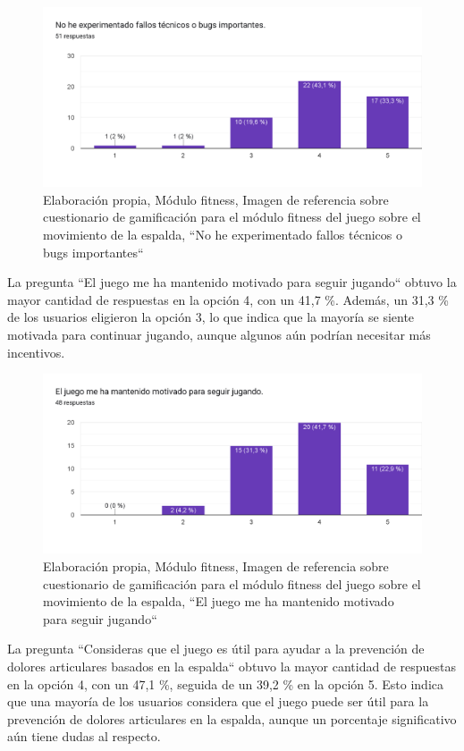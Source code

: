 \begin{figure}[H]
  \centering
  \includegraphics[width=0.7\linewidth]{Imagenes/fd9.png}
  \caption{Elaboración propia, Módulo fitness, Imagen de referencia sobre cuestionario de gamificación para el módulo fitness del juego sobre el movimiento de la espalda, ``No he experimentado fallos técnicos o bugs importantes``}
  \label{fig:cuestionario20fitness}
\end{figure}


La pregunta ``El juego me ha mantenido motivado para seguir jugando`` obtuvo la mayor cantidad de respuestas en la opción 4, con un 41,7 \%. Además, un 31,3 \% de los usuarios eligieron la opción 3, lo que indica que la mayoría se siente motivada para continuar jugando, aunque algunos aún podrían necesitar más incentivos.

\begin{figure}[H]
  \centering
  \includegraphics[width=0.7\linewidth]{Imagenes/fd10.png}
  \caption{Elaboración propia, Módulo fitness, Imagen de referencia sobre cuestionario de gamificación para el módulo fitness del juego sobre el movimiento de la espalda, ``El juego me ha mantenido motivado para seguir jugando``}
  \label{fig:cuestionario21fitness}
\end{figure}

La pregunta ``Consideras que el juego es útil para ayudar a la prevención de dolores articulares basados en la espalda`` obtuvo la mayor cantidad de respuestas en la opción 4, con un 47,1 \%, seguida de un 39,2 \% en la opción 5. Esto indica que una mayoría de los usuarios considera que el juego puede ser útil para la prevención de dolores articulares en la espalda, aunque un porcentaje significativo aún tiene dudas al respecto.

